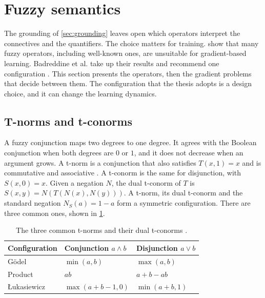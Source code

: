 \section{Fuzzy semantics}
\label{sec:fuzzy-semantics}

The grounding of \cref{sec:grounding} leaves open which operators interpret
the connectives and the quantifiers. The choice matters for training.
\citet{vankrieken2021analyzing} show that many fuzzy operators, including
well-known ones, are unsuitable for gradient-based learning. Badreddine et al.
take up their results and recommend one configuration
\citep{badreddine2022ltn}. This section presents the operators, then the
gradient problems that decide between them. The configuration that the thesis
adopts is a design choice, and it can change the learning dynamics.

\subsection{T-norms and t-conorms}
\label{sec:t-norms}

A fuzzy conjunction maps two degrees to one degree. It agrees with the Boolean
conjunction when both degrees are $0$ or $1$, and it does not decrease when an
argument grows. A t-norm is a conjunction that also satisfies $T(x,1)=x$ and
is commutative and associative \citep{badreddine2022ltn}. A t-conorm is the
same for disjunction, with $S(x,0)=x$. Given a negation $N$, the dual t-conorm
of $T$ is $S(x,y)=N(T(N(x),N(y)))$. A t-norm, its dual t-conorm and the
standard negation $N_S(a)=1-a$ form a symmetric configuration. There are three
common ones, shown in \cref{tab:t-norms}.

\begin{table}[htbp]
\centering
\footnotesize
\caption{The three common t-norms and their dual t-conorms
\citep{badreddine2022ltn}.}
\label{tab:t-norms}
\begin{tabular}{@{}lll@{}}
\toprule
Configuration & Conjunction $a\wedge b$ & Disjunction $a\vee b$ \\
\midrule
G\"odel & $\min(a,b)$ & $\max(a,b)$ \\
Product & $ab$ & $a+b-ab$ \\
{\L}ukasiewicz & $\max(a+b-1,0)$ & $\min(a+b,1)$ \\
\bottomrule
\end{tabular}
\end{table}

